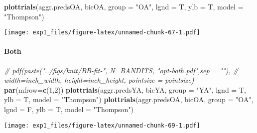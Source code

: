 \documentclass[11pt,,]{article}
\newenvironment{Shaded}{\begin{snugshade}}{\end{snugshade}}
\newcommand{\KeywordTok}[1]{\textcolor[rgb]{0.13,0.29,0.53}{\textbf{{#1}}}}
\newcommand{\DataTypeTok}[1]{\textcolor[rgb]{0.13,0.29,0.53}{{#1}}}
\newcommand{\DecValTok}[1]{\textcolor[rgb]{0.00,0.00,0.81}{{#1}}}
\newcommand{\StringTok}[1]{\textcolor[rgb]{0.31,0.60,0.02}{{#1}}}
\newcommand{\CommentTok}[1]{\textcolor[rgb]{0.56,0.35,0.01}{\textit{{#1}}}}
\newcommand{\NormalTok}[1]{{#1}}
\let\oldparagraph\paragraph
\renewcommand{\paragraph}[1]{\oldparagraph{#1}\mbox{}}
\begin{document}
\begin{Shaded}
\begin{Highlighting}[]
\KeywordTok{plottrials}\NormalTok{(aggr.predsOA, bicOA, }\DataTypeTok{group =} \StringTok{"OA"}\NormalTok{, }\DataTypeTok{lgnd =} \NormalTok{T, }\DataTypeTok{ylb =} \NormalTok{T, }\DataTypeTok{model =} \StringTok{"Thompson"}\NormalTok{)}
\end{Highlighting}
\end{Shaded}

\texttt{[image: exp1\_files/figure-latex/unnamed-chunk-67-1.pdf]}

\newpage

\paragraph{Both}\label{both}

\begin{Shaded}
\end{Shaded}

\begin{Shaded}
\begin{Highlighting}[]
\CommentTok{# pdf(paste("../figs/knit/BB-fit-",  N_BANDITS, "opt-both.pdf",sep = ""), }
\CommentTok{# width=inch_width, height=inch_height, pointsize = pointsize)}
\KeywordTok{par}\NormalTok{(}\DataTypeTok{mfrow=}\KeywordTok{c}\NormalTok{(}\DecValTok{1}\NormalTok{,}\DecValTok{2}\NormalTok{))}
\KeywordTok{plottrials}\NormalTok{(aggr.predsYA, bicYA, }\DataTypeTok{group =} \StringTok{"YA"}\NormalTok{, }\DataTypeTok{lgnd =} \NormalTok{T, }\DataTypeTok{ylb =} \NormalTok{T, }\DataTypeTok{model =} \StringTok{"Thompson"}\NormalTok{)}
\KeywordTok{plottrials}\NormalTok{(aggr.predsOA, bicOA, }\DataTypeTok{group =} \StringTok{"OA"}\NormalTok{, }\DataTypeTok{lgnd =} \NormalTok{F, }\DataTypeTok{ylb =} \NormalTok{T, }\DataTypeTok{model =} \StringTok{"Thompson"}\NormalTok{)}
\end{Highlighting}
\end{Shaded}

\texttt{[image: exp1\_files/figure-latex/unnamed-chunk-69-1.pdf]}
\end{document}
